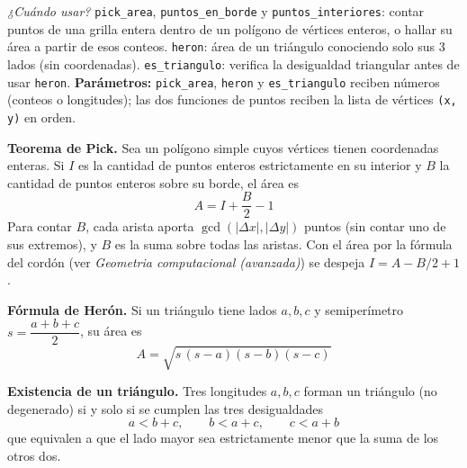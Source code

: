 \textit{¿Cuándo usar?} \texttt{pick\_area}, \texttt{puntos\_en\_borde} y \texttt{puntos\_interiores}: contar puntos de una grilla entera dentro de un polígono de vértices enteros, o hallar su área a partir de esos conteos. \texttt{heron}: área de un triángulo conociendo solo sus 3 lados (sin coordenadas). \texttt{es\_triangulo}: verifica la desigualdad triangular antes de usar \texttt{heron}. \textbf{Parámetros:} \texttt{pick\_area}, \texttt{heron} y \texttt{es\_triangulo} reciben números (conteos o longitudes); las dos funciones de puntos reciben la lista de vértices \texttt{(x, y)} en orden.

\textbf{Teorema de Pick.} Sea un polígono simple cuyos vértices tienen coordenadas enteras. Si \(I\) es la cantidad de puntos enteros estrictamente en su interior y \(B\) la cantidad de puntos enteros sobre su borde, el área es
\[
A = I + \frac{B}{2} - 1
\]
Para contar \(B\), cada arista aporta \(\gcd(|\Delta x|, |\Delta y|)\) puntos (sin contar uno de sus extremos), y \(B\) es la suma sobre todas las aristas. Con el área por la fórmula del cordón (ver \textit{Geometria computacional (avanzada)}) se despeja \(I = A - B/2 + 1\).

\textbf{Fórmula de Herón.} Si un triángulo tiene lados \(a, b, c\) y semiperímetro \(s = \dfrac{a+b+c}{2}\), su área es
\[
A = \sqrt{s\,(s-a)(s-b)(s-c)}
\]

\textbf{Existencia de un triángulo.} Tres longitudes \(a, b, c\) forman un triángulo (no degenerado) si y solo si se cumplen las tres desigualdades
\[
a < b + c, \qquad b < a + c, \qquad c < a + b
\]
que equivalen a que el lado mayor sea estrictamente menor que la suma de los otros dos.
